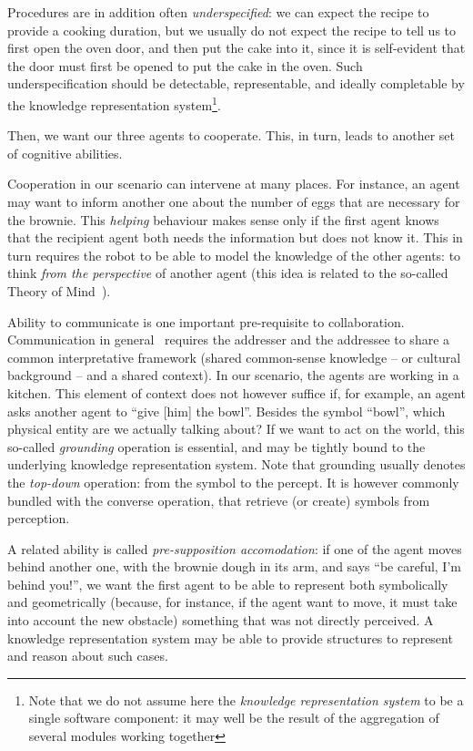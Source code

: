 Procedures are in addition often \emph{underspecified}: we can expect the recipe
to provide a cooking duration, but we usually do not expect the recipe to tell
us to first open the oven door, and then put the cake into it, since it is
self-evident that the door must first be opened to put the cake in the oven.
Such underspecification should be detectable, representable, and ideally
completable by the knowledge representation system\footnote{Note that we do not
assume here the {\it knowledge representation system} to be a single software
component: it may well be the result of the aggregation of several modules
working together}.

Then, we want our three agents to cooperate. This, in turn, leads to another
set of cognitive abilities.

Cooperation in our scenario can intervene at many places. For instance, an
agent may want to inform another one about the number of eggs that are
necessary for the brownie. This \emph{helping} behaviour makes sense only if
the first agent knows that the recipient agent both needs the information but
does not know it. This in turn requires the robot to be able to model the
knowledge of the other agents: to think \emph{from the perspective} of another
agent (this idea is related to the so-called Theory of Mind~\cite{...}).

Ability to communicate is one important pre-requisite to collaboration.
Communication in general~\cite{Jakobson} requires the addresser and the
addressee to share a common interpretative framework (shared common-sense
knowledge -- or cultural background -- and a shared context). In our scenario,
the agents are working in a kitchen. This element of context does not however
suffice if, for example, an agent asks another agent to ``give {[him]} the
bowl''. Besides the symbol ``bowl'', which physical entity are we actually
talking about? If we want to act on the world, this so-called \emph{grounding}
operation is essential, and may be tightly bound to the underlying knowledge
representation system. Note that grounding usually denotes the {\it top-down}
operation: from the symbol to the percept. It is however commonly bundled with
the converse operation, that retrieve (or create) symbols from perception.

A related ability is called \emph{pre-supposition accomodation}: if one of the
agent moves behind another one, with the brownie dough in its arm, and says
``be careful, I'm behind you!'', we want the first agent to be able to
represent both symbolically and geometrically (because, for instance, if the
agent want to move, it must take into account the new obstacle) something that
was not directly perceived. A knowledge representation system may be able to
provide structures to represent and reason about such cases.

